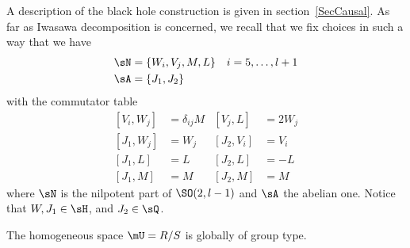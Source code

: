 A description of the black hole construction is given in section~\ref{SecCausal}. As far as Iwasawa decomposition is concerned, we recall that we fix choices in such a way that we have
\begin{subequations}
\begin{align}
\sN&=\{W_i,V_j,M,L\}&i=5,\ldots, l+1\\
\sA&=\{J_1,J_2\}
\end{align}
\end{subequations}
 with the commutator table
\begin{subequations} %
\begin{align}
[V_i,W_j]&=\delta_{ij}M &[V_j,L]&=2W_j\\
[J_1,W_j]&=W_j       &[J_2,V_i]&=V_i\\
[J_1,L]&=L           &[J_2,L]&=-L\\
[J_1,M]&=M           &[J_2,M]&=M
\end{align}
\end{subequations}
  where $\sN$ is the nilpotent part of $\SO(2,l-1)$ and $\sA$ the abelian one. Notice that $W,J_{1}\in\sH$, and $J_{2}\in\sQ$.

\begin{proposition}\label{PropRsurSglobgroup}
The homogeneous space $\mU=R/S$ is globally of group type.
\end{proposition}

